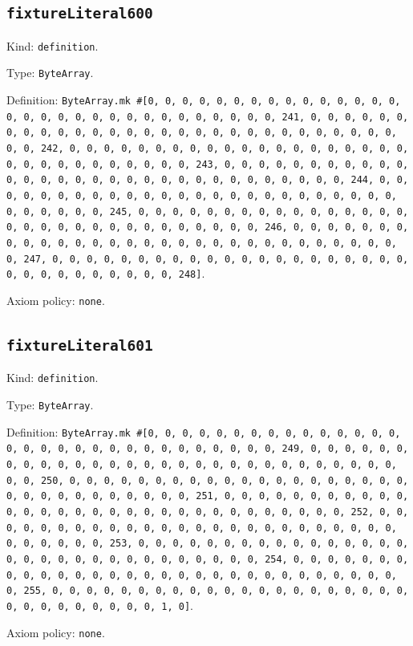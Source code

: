 \documentclass[11pt]{article}
\begin{document}
\subsection*{\texttt{fixtureLiteral600}}
\noindent Kind: \texttt{definition}.\par
\noindent Type: \texttt{ByteArray}.\par
\noindent Definition: \texttt{ByteArray.mk \#[0, 0, 0, 0, 0, 0, 0, 0, 0, 0, 0, 0, 0, 0, 0, 0, 0, 0, 0, 0, 0, 0, 0, 0, 0, 0, 0, 0, 0, 0, 0, 241, 0, 0, 0, 0, 0, 0, 0, 0, 0, 0, 0, 0, 0, 0, 0, 0, 0, 0, 0, 0, 0, 0, 0, 0, 0, 0, 0, 0, 0, 0, 0, 242, 0, 0, 0, 0, 0, 0, 0, 0, 0, 0, 0, 0, 0, 0, 0, 0, 0, 0, 0, 0, 0, 0, 0, 0, 0, 0, 0, 0, 0, 0, 0, 243, 0, 0, 0, 0, 0, 0, 0, 0, 0, 0, 0, 0, 0, 0, 0, 0, 0, 0, 0, 0, 0, 0, 0, 0, 0, 0, 0, 0, 0, 0, 0, 244, 0, 0, 0, 0, 0, 0, 0, 0, 0, 0, 0, 0, 0, 0, 0, 0, 0, 0, 0, 0, 0, 0, 0, 0, 0, 0, 0, 0, 0, 0, 0, 245, 0, 0, 0, 0, 0, 0, 0, 0, 0, 0, 0, 0, 0, 0, 0, 0, 0, 0, 0, 0, 0, 0, 0, 0, 0, 0, 0, 0, 0, 0, 0, 246, 0, 0, 0, 0, 0, 0, 0, 0, 0, 0, 0, 0, 0, 0, 0, 0, 0, 0, 0, 0, 0, 0, 0, 0, 0, 0, 0, 0, 0, 0, 0, 247, 0, 0, 0, 0, 0, 0, 0, 0, 0, 0, 0, 0, 0, 0, 0, 0, 0, 0, 0, 0, 0, 0, 0, 0, 0, 0, 0, 0, 0, 0, 0, 248]}.\par
\noindent Axiom policy: \texttt{none}.\par
\subsection*{\texttt{fixtureLiteral601}}
\noindent Kind: \texttt{definition}.\par
\noindent Type: \texttt{ByteArray}.\par
\noindent Definition: \texttt{ByteArray.mk \#[0, 0, 0, 0, 0, 0, 0, 0, 0, 0, 0, 0, 0, 0, 0, 0, 0, 0, 0, 0, 0, 0, 0, 0, 0, 0, 0, 0, 0, 0, 0, 249, 0, 0, 0, 0, 0, 0, 0, 0, 0, 0, 0, 0, 0, 0, 0, 0, 0, 0, 0, 0, 0, 0, 0, 0, 0, 0, 0, 0, 0, 0, 0, 250, 0, 0, 0, 0, 0, 0, 0, 0, 0, 0, 0, 0, 0, 0, 0, 0, 0, 0, 0, 0, 0, 0, 0, 0, 0, 0, 0, 0, 0, 0, 0, 251, 0, 0, 0, 0, 0, 0, 0, 0, 0, 0, 0, 0, 0, 0, 0, 0, 0, 0, 0, 0, 0, 0, 0, 0, 0, 0, 0, 0, 0, 0, 0, 252, 0, 0, 0, 0, 0, 0, 0, 0, 0, 0, 0, 0, 0, 0, 0, 0, 0, 0, 0, 0, 0, 0, 0, 0, 0, 0, 0, 0, 0, 0, 0, 253, 0, 0, 0, 0, 0, 0, 0, 0, 0, 0, 0, 0, 0, 0, 0, 0, 0, 0, 0, 0, 0, 0, 0, 0, 0, 0, 0, 0, 0, 0, 0, 254, 0, 0, 0, 0, 0, 0, 0, 0, 0, 0, 0, 0, 0, 0, 0, 0, 0, 0, 0, 0, 0, 0, 0, 0, 0, 0, 0, 0, 0, 0, 0, 255, 0, 0, 0, 0, 0, 0, 0, 0, 0, 0, 0, 0, 0, 0, 0, 0, 0, 0, 0, 0, 0, 0, 0, 0, 0, 0, 0, 0, 0, 0, 1, 0]}.\par
\noindent Axiom policy: \texttt{none}.\par
\end{document}
